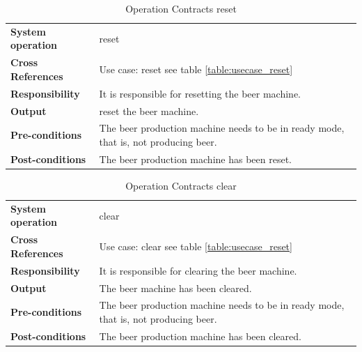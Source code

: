 \begin{table}[H]
    \begin{tabularx}{\textwidth}{|>{\RaggedRight}p{3.7cm}|>{\RaggedRight}X|}
        \hline
        \multicolumn{2}{|c|}{\textbf{reset}}\\
        \hline
        \textbf{System operation} & reset \\
        \hline
        \textbf{Cross References} & Use case: reset see table \ref{table:usecase_reset} \\
        \hline
        \textbf{Responsibility} & It is responsible for resetting the beer 
                machine.\\
        \hline
        \textbf{Output} & reset the beer machine. \\
        \hline
        \textbf{Pre-conditions} & The beer production machine needs to be in
                ready mode, that is, not producing beer. \\
        \hline
        \textbf{Post-conditions} & The beer production machine has been reset. \\
        \hline
    \end{tabularx}
    \caption{Operation Contracts reset} 
    \label{table:Operation_Contracts_reset}
\end{table}

\begin{table}[H]
    \begin{tabularx}{\textwidth}{|>{\RaggedRight}p{3.7cm}|>{\RaggedRight}X|}
        \hline
        \multicolumn{2}{|c|}{\textbf{clear}}\\
        \hline
        \textbf{System operation} & clear\\
        \hline
        \textbf{Cross References} & Use case: clear see table \ref{table:usecase_reset} \\
        \hline
        \textbf{Responsibility} & It is responsible for clearing the beer 
                machine. \\
        \hline
        \textbf{Output} & The beer machine has been cleared. \\
        \hline
        \textbf{Pre-conditions} & The beer production machine needs to be in
                ready mode, that is, not producing beer. \\
        \hline
        \textbf{Post-conditions} & The beer production machine has been cleared.\\
        \hline
    \end{tabularx}
    \caption{Operation Contracts clear} 
    \label{table:Operation_Contracts_clear}
\end{table}


